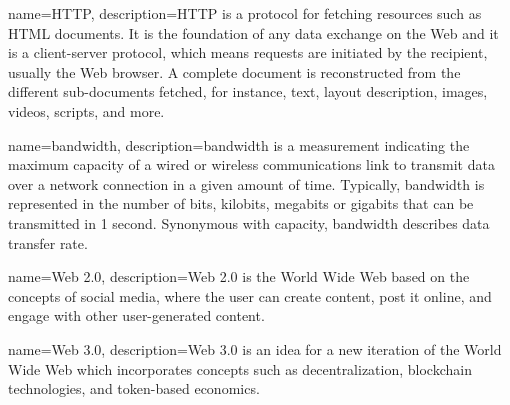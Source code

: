  {
  name=HTTP,
  description={HTTP is a protocol for fetching resources such as HTML documents. It is the foundation of any data exchange on the Web and it is a client-server protocol, which means requests are initiated by the recipient, usually the Web browser. A complete document is reconstructed from the different sub-documents fetched, for instance, text, layout description, images, videos, scripts, and more.}
}

 {
  name=bandwidth,
  description={bandwidth is a measurement indicating the maximum capacity of a wired or wireless communications link to transmit data over a network connection in a given amount of time. Typically, bandwidth is represented in the number of bits, kilobits, megabits or gigabits that can be transmitted in 1 second. Synonymous with capacity, bandwidth describes data transfer rate.}
}

 {
  name=Web 2.0,
  description={Web 2.0 is the World Wide Web based on the concepts of social media, where the user can create content, post it online, and engage with other user-generated content.}
}

 {
  name=Web 3.0,
  description={Web 3.0 is an idea for a new iteration of the World Wide Web which incorporates concepts such as decentralization, blockchain technologies, and token-based economics.}
}
